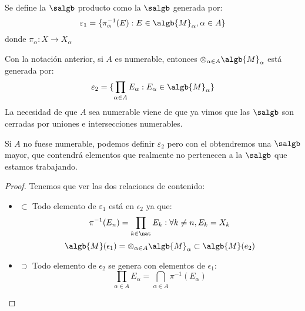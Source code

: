 \documentclass{apuntes}
\begin{document}
\begin{defn}
Se define la $\salgb$ producto como la $\salgb$ generada por:
\[\varepsilon_1 = \{\pi_\alpha^{-1}(E):E \in \algb{M}_\alpha, \alpha\in A\}\]
donde $\pi_\alpha: X \rightarrow X_\alpha$
\end{defn}

\begin{prop}
Con la notación anterior, si $A$ es numerable, entonces $\otimes_{\alpha\in A}\algb{M}_\alpha$ está generada por:
\[\varepsilon_2 = \{\prod_{\alpha\in A}E_\alpha:E_\alpha \in \algb{M}_\alpha\}\]
La necesidad de que $A$ sea numerable viene de que ya vimos que las $\salgb$ son cerradas por uniones e intersecciones numerables.

Si $A$ no fuese numerable, podemos definir $\varepsilon_2$ pero con el obtendremos una $\salgb$ mayor, que contendrá elementos que realmente no pertenecen a la $\salgb$ que estamos trabajando.
\end{prop}
\begin{proof}
Tenemos que ver las dos relaciones de contenido:
\begin{itemize}
\item $\subset$
Todo elemento de $\varepsilon_1$ está en $\epsilon_2$ ya que:
\[\pi^{-1}(E_n)=\prod_{k \in \nat}E_k : \forall k\neq n, E_k=X_k\]
\[\algb{M}(\epsilon_1)=\otimes_{\alpha \in A}\algb{M}_\alpha \subset \algb{M}(e_2)\]
\item $\supset$
Todo elemento de $\epsilon_2$ se genera con elementos de $\epsilon_1$:
\[\prod_{\alpha\in A}E_\alpha = \bigcap_{\alpha\in A} \pi^{-1}(E_\alpha)\]
\end{itemize}
\end{proof}
\end{document}

